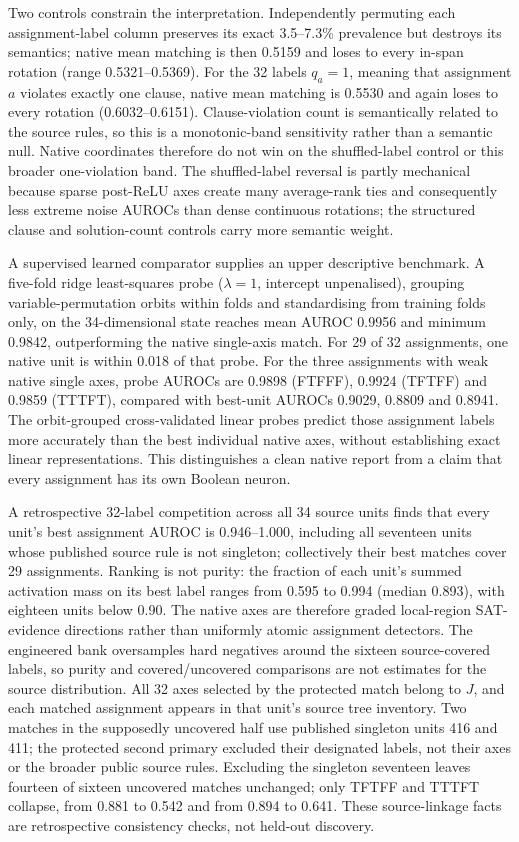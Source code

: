 \documentclass[
  british,
  11pt,
  a4paper,
]{article}
\begin{document}
Two controls constrain the interpretation. Independently permuting each
assignment-label column preserves its exact 3.5--7.3\% prevalence but
destroys its semantics; native mean matching is then 0.5159 and loses to
every in-span rotation (range 0.5321--0.5369). For the 32 labels
\(q_a=1\), meaning that assignment \(a\) violates exactly one clause,
native mean matching is 0.5530 and again loses to every rotation
(0.6032--0.6151). Clause-violation count is semantically related to the
source rules, so this is a monotonic-band sensitivity rather than a
semantic null. Native coordinates therefore do not win on the
shuffled-label control or this broader one-violation band. The
shuffled-label reversal is partly mechanical because sparse post-ReLU
axes create many average-rank ties and consequently less extreme noise
AUROCs than dense continuous rotations; the structured clause and
solution-count controls carry more semantic weight.

A supervised learned comparator supplies an upper descriptive benchmark.
A five-fold ridge least-squares probe (\(\lambda=1\), intercept
unpenalised), grouping variable-permutation orbits within folds and
standardising from training folds only, on the 34-dimensional state
reaches mean AUROC 0.9956 and minimum 0.9842, outperforming the native
single-axis match. For 29 of 32 assignments, one native unit is within
0.018 of that probe. For the three assignments with weak native single
axes, probe AUROCs are 0.9898 (FTFFF), 0.9924 (TFTFF) and 0.9859
(TTTFT), compared with best-unit AUROCs 0.9029, 0.8809 and 0.8941. The
orbit-grouped cross-validated linear probes predict those assignment
labels more accurately than the best individual native axes, without
establishing exact linear representations. This distinguishes a clean
native report from a claim that every assignment has its own Boolean
neuron.

A retrospective 32-label competition across all 34 source units finds
that every unit's best assignment AUROC is 0.946--1.000, including all
seventeen units whose published source rule is not singleton;
collectively their best matches cover 29 assignments. Ranking is not
purity: the fraction of each unit's summed activation mass on its best
label ranges from 0.595 to 0.994 (median 0.893), with eighteen units
below 0.90. The native axes are therefore graded local-region
SAT-evidence directions rather than uniformly atomic assignment
detectors. The engineered bank oversamples hard negatives around the
sixteen source-covered labels, so purity and covered/uncovered
comparisons are not estimates for the source distribution. All 32 axes
selected by the protected match belong to \(J\), and each matched
assignment appears in that unit's source tree inventory. Two matches in
the supposedly uncovered half use published singleton units 416 and 411;
the protected second primary excluded their designated labels, not their
axes or the broader public source rules. Excluding the singleton
seventeen leaves fourteen of sixteen uncovered matches unchanged; only
TFTFF and TTTFT collapse, from 0.881 to 0.542 and from 0.894 to 0.641.
These source-linkage facts are retrospective consistency checks, not
held-out discovery.
\end{document}
